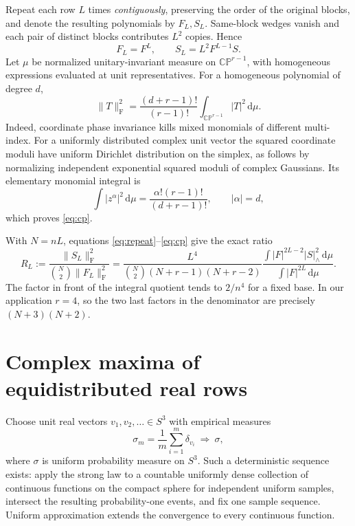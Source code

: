 \documentclass[11pt]{article}
\theoremstyle{remark}
\newcommand{\CP}{\mathbb{CP}}
\newcommand{\normF}[1]{\lVert #1\rVert_{\mathrm F}}
\newcommand{\normW}[1]{\lvert #1\rvert_{\wedge}}
\newcommand{\dd}{\,\mathrm d}
\begin{document}
Repeat each row $L$ times \emph{contiguously}, preserving the order of the original blocks, and denote the resulting polynomials by $F_L,S_L$. Same-block wedges vanish and each pair of distinct blocks contributes $L^2$ copies. Hence
\begin{equation}\label{eq:repeat}
 F_L=F^L,\qquad S_L=L^2F^{L-1}S.
\end{equation}
Let $\mu$ be normalized unitary-invariant measure on $\CP^{r-1}$, with homogeneous expressions evaluated at unit representatives. For a homogeneous polynomial of degree $d$,
\begin{equation}\label{eq:cp}
 \normF{T}^2=\frac{(d+r-1)!}{(r-1)!}\int_{\CP^{r-1}}|T|^2\dd\mu.
\end{equation}
Indeed, coordinate phase invariance kills mixed monomials of different multi-index. For a uniformly distributed complex unit vector the squared coordinate moduli have uniform Dirichlet distribution on the simplex, as follows by normalizing independent exponential squared moduli of complex Gaussians. Its elementary monomial integral is
\[
 \int |z^\alpha|^2\dd\mu=\frac{\alpha!(r-1)!}{(d+r-1)!},\qquad |\alpha|=d,
\]
which proves \eqref{eq:cp}.

With $N=nL$, equations \eqref{eq:repeat}--\eqref{eq:cp} give the exact ratio
\begin{equation}\label{eq:ratio}
 R_L:=\frac{\normF{S_L}^2}{\binom N2\normF{F_L}^2}
 =\frac{L^4}{\binom N2(N+r-1)(N+r-2)}
 \frac{\int |F|^{2L-2}\normW{S}^2\dd\mu}
      {\int |F|^{2L}\dd\mu}.
\end{equation}
The factor in front of the integral quotient tends to $2/n^4$ for a fixed base. In our application $r=4$, so the two last factors in the denominator are precisely $(N+3)(N+2)$.

\section{Complex maxima of equidistributed real rows}
Choose unit real vectors $v_1,v_2,\ldots\in S^3$ with empirical measures
\[
 \sigma_m=\frac1m\sum_{i=1}^m\delta_{v_i}\ \Longrightarrow\ \sigma,
\]
where $\sigma$ is uniform probability measure on $S^3$. Such a deterministic sequence exists: apply the strong law to a countable uniformly dense collection of continuous functions on the compact sphere for independent uniform samples, intersect the resulting probability-one events, and fix one sample sequence. Uniform approximation extends the convergence to every continuous function.
\end{document}
